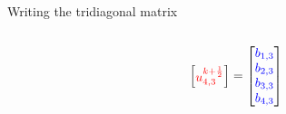 \documentclass{beamer}
\begin{document}
\begin{frame}{Writing the tridiagonal matrix}
\begin{columns}
\begin{column}{0.7\textwidth}
{\begin{align*}
\begin{bmatrix}
                        \textcolor{red}{u_{4,3}^{k+\frac{1}{2}}} \\
                    \end{bmatrix}
                    =
                    \begin{bmatrix}
                        \textcolor{blue}{b_{1,3}} \\
                        \textcolor{blue}{b_{2,3}} \\
                        \textcolor{blue}{b_{3,3}} \\
                        \textcolor{blue}{b_{4,3}} \\
                    \end{bmatrix}
                \end{align*}
                }
                \vspace{-1.5cm}
        \end{column}
    \end{columns}
   
    \vspace{0.1cm}
    \small
\end{frame}
\end{document}
